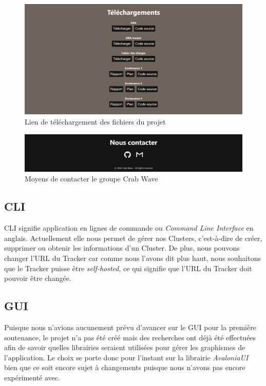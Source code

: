 \documentclass[11pt, a4paper]{report}
\begin{document}
      \begin{figure}[H]
        \centering
        \includegraphics[width=17cm]{assets/presentation1/website_screenshots/downloads.png}
        \caption{Lien de téléchargement des fichiers du projet}
      \end{figure}
      \begin{figure}[H]
        \centering
        \includegraphics[width=17cm]{assets/presentation1/website_screenshots/contact.png}
        \caption{Moyens de contacter le groupe Crab Wave}
      \end{figure}

    \subsection{CLI}
      CLI signifie application en lignes de commande ou \textit{Command Line Interface} en anglais. Actuellement elle nous permet de gérer nos Clusters, c'est-à-dire de créer, supprimer ou obtenir les informations d'un Cluster. De plus, nous pouvons changer l'URL du Tracker car comme nous l'avons dit plus haut, nous souhaitons que le Tracker puisse être \textit{self-hosted}, ce qui signifie que l'URL du Tracker doit pouvoir être changée.
      
    \subsection{GUI}
      Puisque nous n'avions aucunement prévu d'avancer sur le GUI pour la première soutenance, le projet n'a pas été créé mais des recherches ont déjà été effectuées afin de savoir quelles librairies seraient utilisées pour gérer les graphismes de l'application. Le choix se porte donc pour l'instant sur la librairie \textit{AvaloniaUI} bien que ce soit encore sujet à changements puisque nous n'avons pas encore expérimenté avec.
      
\end{document}
